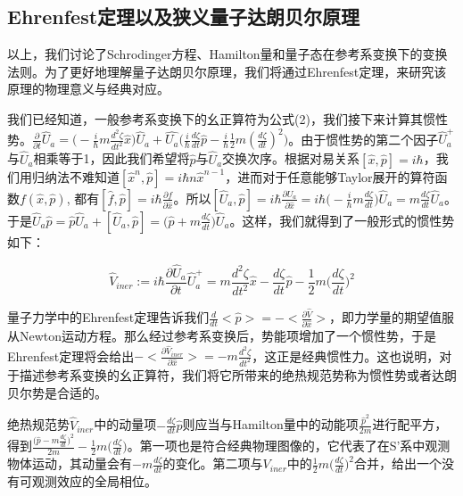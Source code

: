 \documentclass[a4paper]{article}
\begin{document}
    \subsection{Ehrenfest定理以及狭义量子达朗贝尔原理}

        以上，我们讨论了Schrodinger方程、Hamilton量和量子态在参考系变换下的变换法则。为了更好地理解量子达朗贝尔原理，我们将通过Ehrenfest定理，来研究该原理的物理意义与经典对应。

        我们已经知道，一般参考系变换下的幺正算符为公式(2)，我们接下来计算其惯性势。$\frac{\partial}{\partial t}\hat{U}_a = \big(-\frac{i}{\hbar}m\frac{d^2 \zeta}{dt^2} \hat{x}\big)\hat{U}_a + \hat{U_a}\big(\frac{i}{\hbar}\frac{d\zeta}{dt}\hat{p} - \frac{i}{\hbar}\frac{1}{2}m(\frac{d\zeta}{dt})^2\big)$。由于惯性势的第二个因子$\hat{U}_a^+$与$\hat{U}_a$相乘等于1，因此我们希望将$\hat{p}$与$\hat{U}_a$交换次序。根据对易关系$[\hat{x},\hat{p}]=i\hbar$，我们用归纳法不难知道$[\hat{x}^n,\hat{p}]=i\hbar n\hat{x}^{n-1}$，进而对于任意能够Taylor展开的算符函数$f(\hat{x},\hat{p})$, 都有$[\hat{f}, \hat{p}]=i\hbar\frac{\partial f}{\partial\hat{x}}$。所以$[\hat{U}_a, \hat{p}] = i\hbar\frac{\partial\hat{U}_a}{\partial\hat{x}} = i\hbar\big(-\frac{i}{\hbar}m\frac{d\zeta}{dt}\big)\hat{U}_a = m\frac{d\zeta}{dt}\hat{U}_a$。于是$\hat{U}_a\hat{p} = \hat{p}\hat{U}_a + [\hat{U}_a, \hat{p}] = \big(\hat{p}+m\frac{d\zeta}{dt}\big)\hat{U}_a$。这样，我们就得到了一般形式的惯性势如下：

        \begin{equation}
            \hat{V}_{iner} := i\hbar\frac{\partial\hat{U}_a}{\partial t}\hat{U}_a^+ = m \frac{d^2\zeta}{d t^2}\hat{x}-\frac{d\zeta}{dt}\hat{p}-\frac{1}{2}m\bigg(\frac{d\zeta}{dt}\bigg)^2
        \end{equation}

        量子力学中的Ehrenfest定理告诉我们$\frac{d}{dt}<\hat{p}>=-<\frac{\partial\hat{V}}{\partial \hat{x}}>$，即力学量的期望值服从Newton运动方程。那么经过参考系变换后，势能项增加了一个惯性势，于是Ehrenfest定理将会给出$-<\frac{\partial\hat{V}_{iner}}{\partial \hat{x}}>=-m \frac{d^2\zeta}{d t^2}$，这正是经典惯性力。这也说明，对于描述参考系变换的幺正算符，我们将它所带来的绝热规范势称为惯性势或者达朗贝尔势是合适的。

        绝热规范势$\hat{V}_{iner}$中的动量项$-\frac{d\zeta}{dt}\hat{p}$则应当与Hamilton量中的动能项$\frac{\hat{p}^2}{2m}$进行配平方，得到$\frac{\big(\hat{p}-m\frac{d\zeta}{dt}\big)^2}{2m}-\frac{1}{2}m\big(\frac{d\zeta}{dt}\big)$。第一项也是符合经典物理图像的，它代表了在S'系中观测物体运动，其动量会有$-m\frac{d\zeta}{dt}$的变化。第二项与$V_{iner}$中的$\frac{1}{2}m\big(\frac{d\zeta}{dt}\big)^2$合并，给出一个没有可观测效应的全局相位。
        
\end{document}
